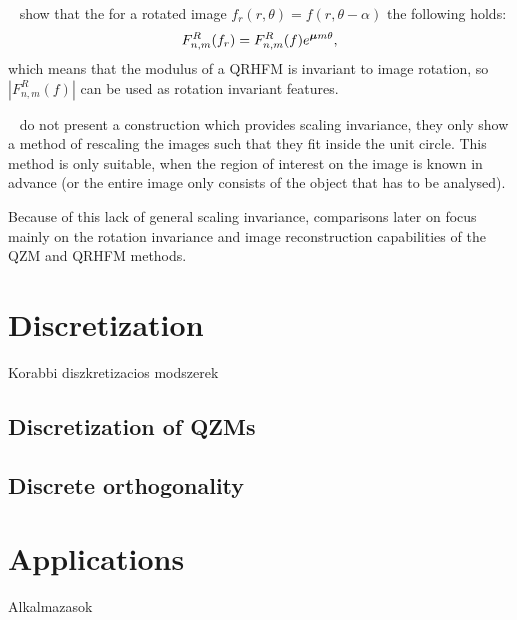 \citeauthor{LiuAcc}~\cite{LiuAcc} show that the for a rotated image $f_r(r, \theta) = f(r, \theta - \alpha)$ the following holds:
\begin{gather*}
    F_{n,m}^R(f_r) = F_{n,m}^R(f) e^{\boldsymbol{\mu} m \theta},
\end{gather*}
which means that the modulus of a QRHFM is invariant to image rotation, so $|F_{n,m}^R(f)|$ can be used as rotation invariant features.


\citeauthor{LiuAcc}~\cite{LiuAcc} do not present a construction which provides scaling invariance, they only show a method of rescaling the images such that they fit inside the unit circle. This method is only suitable, when the region of interest on the image is known in advance (or the entire image only consists of the object that has to be analysed). 

Because of this lack of general scaling invariance, comparisons later on focus mainly on the rotation invariance and image reconstruction capabilities of the QZM and QRHFM methods.

\section{Discretization}
Korabbi diszkretizacios modszerek
\subsection{Discretization of QZMs}
\subsection{Discrete orthogonality}


\section{Applications}
Alkalmazasok






